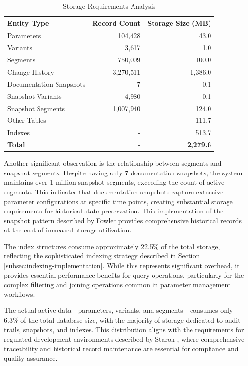 \begin{table}[h]
\centering
\caption{Storage Requirements Analysis}
\label{tab:storage-requirements}
\begin{tabular}{|l|r|r|}
\hline
\textbf{Entity Type} & \textbf{Record Count} & \textbf{Storage Size (MB)} \\
\hline
Parameters & 104,428 & 43.0 \\
\hline
Variants & 3,617 & 1.0 \\
\hline
Segments & 750,009 & 100.0 \\
\hline
Change History & 3,270,511 & 1,386.0 \\
\hline
Documentation Snapshots & 7 & 0.1 \\
\hline
Snapshot Variants & 4,980 & 0.1 \\
\hline
Snapshot Segments & 1,007,940 & 124.0 \\
\hline
Other Tables & - & 111.7 \\
\hline
Indexes & - & 513.7 \\
\hline
\textbf{Total} & - & \textbf{2,279.6} \\
\hline
\end{tabular}
\end{table}

Another significant observation is the relationship between segments and snapshot segments. Despite having only 7 documentation snapshots, the system maintains over 1 million snapshot segments, exceeding the count of active segments. This indicates that documentation snapshots capture extensive parameter configurations at specific time points, creating substantial storage requirements for historical state preservation. This implementation of the snapshot pattern described by Fowler \cite{fowler2003patterns} provides comprehensive historical records at the cost of increased storage utilization.

The index structures consume approximately 22.5\% of the total storage, reflecting the sophisticated indexing strategy described in Section \ref{subsec:indexing-implementation}. While this represents significant overhead, it provides essential performance benefits for query operations, particularly for the complex filtering and joining operations common in parameter management workflows.

The actual active data—parameters, variants, and segments—consumes only 6.3\% of the total database size, with the majority of storage dedicated to audit trails, snapshots, and indexes. This distribution aligns with the requirements for regulated development environments described by Staron \cite{staron2021automotive}, where comprehensive traceability and historical record maintenance are essential for compliance and quality assurance.

